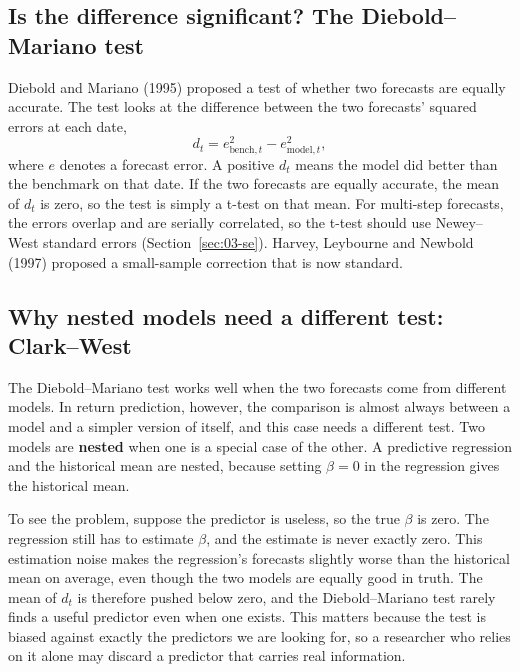\subsection{Is the difference significant? The Diebold--Mariano test}

Diebold and Mariano (1995) proposed a test of whether two forecasts are equally accurate. The test looks at the difference between the two forecasts' squared errors at each date,
\begin{equation}
  d_t = e^2_{\text{bench},t} - e^2_{\text{model},t},
  \label{eq:05-dm}
\end{equation}
where $e$ denotes a forecast error. A positive $d_t$ means the model did better than the benchmark on that date. If the two forecasts are equally accurate, the mean of $d_t$ is zero, so the test is simply a t-test on that mean. For multi-step forecasts, the errors overlap and are serially correlated, so the t-test should use Newey--West standard errors (Section~\ref{sec:03-se}). Harvey, Leybourne and Newbold (1997) proposed a small-sample correction that is now standard.

\subsection{Why nested models need a different test: Clark--West}

The Diebold--Mariano test works well when the two forecasts come from different models. In return prediction, however, the comparison is almost always between a model and a simpler version of itself, and this case needs a different test. Two models are \textbf{nested} when one is a special case of the other. A predictive regression and the historical mean are nested, because setting $\beta = 0$ in the regression gives the historical mean.

To see the problem, suppose the predictor is useless, so the true $\beta$ is zero. The regression still has to estimate $\beta$, and the estimate is never exactly zero. This estimation noise makes the regression's forecasts slightly worse than the historical mean on average, even though the two models are equally good in truth. The mean of $d_t$ is therefore pushed below zero, and the Diebold--Mariano test rarely finds a useful predictor even when one exists. This matters because the test is biased against exactly the predictors we are looking for, so a researcher who relies on it alone may discard a predictor that carries real information.

